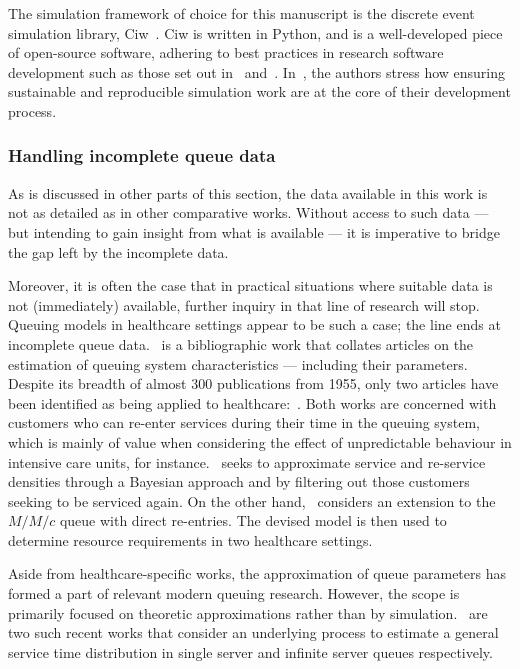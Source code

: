 \documentclass[]{interact}
\theoremstyle{plain}%
\theoremstyle{definition}
\theoremstyle{remark}
\begin{document}
The simulation framework of choice for this manuscript is the discrete event
simulation library, Ciw~\citep{Palmer2019}. Ciw is written in Python, and is a
well-developed piece of open-source software, adhering to best practices in
research software development such as those set out in~\cite{Benureau2018}
and~\cite{Jimenez2017}. In~\cite{Palmer2019}, the authors stress how ensuring
sustainable and reproducible simulation work are at the core of their
development process.

\subsubsection{Handling incomplete queue data}

As is discussed in other parts of this section, the data available in this work
is not as detailed as in other comparative works. Without access to such data
--- but intending to gain insight from what is available --- it is
imperative to bridge the gap left by the incomplete data.

Moreover, it is often the case that in practical situations where suitable data
is not (immediately) available, further inquiry in that line of research will
stop. Queuing models in healthcare settings appear to be such a case; the line
ends at incomplete queue data.~\cite{Asanjarani2017} is a bibliographic work
that collates articles on the estimation of queuing system characteristics ---
including their parameters. Despite its breadth of almost 300 publications from
1955, only two articles have been identified as being applied to
healthcare:~\cite{Mohammadi2012,Yom2014}. Both works are concerned with
customers who can re-enter services during their time in the queuing system,
which is mainly of value when considering the effect of unpredictable behaviour
in intensive care units, for instance.~\cite{Mohammadi2012} seeks to approximate
service and re-service densities through a Bayesian approach and by filtering
out those customers seeking to be serviced again. On the other
hand,~\cite{Yom2014} considers an extension to the \(M/M/c\) queue with direct
re-entries. The devised model is then used to determine resource requirements in
two healthcare settings.

Aside from healthcare-specific works, the approximation of queue parameters has
formed a part of relevant modern queuing research. However, the scope is
primarily focused on theoretic approximations rather than by
simulation.~\cite{Djabali2018,Goldenshluger2016} are two such recent works that
consider an underlying process to estimate a general service time distribution
in single server and infinite server queues respectively.
\end{document}
